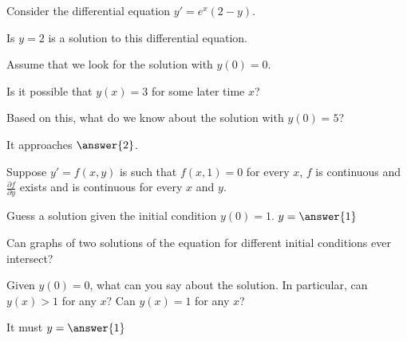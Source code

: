 \documentclass{ximera}
\begin{document}
\begin{exercise}
    Consider the differential equation $y' = e^x(2-y)$.
    
    Is $y = 2$ is a solution to this differential equation.
    \begin{multipleChoice}
    \end{multipleChoice}
    \begin{problem}
        Assume that we look for the solution with $y(0) = 0$. 
        \begin{multipleChoice}
        \end{multipleChoice}
        \begin{problem}
            Is it possible that $y(x) = 3$ for some later time $x$? 
            \begin{multipleChoice}
            \end{multipleChoice}
            \begin{problem}
                Based on this, what do we know about the solution with $y(0) = 5$?
                
                It approaches $\answer{2}$.
            \end{problem}
        \end{problem}
    \end{problem}
\end{exercise}

\begin{exercise}%
    Suppose $y' = f(x,y)$ is such that $f(x,1) = 0$ for every $x$, $f$ is continuous and $\frac{\partial f}{\partial y}$ exists and is continuous for every $x$ and $y$.
    
    Guess a solution given the initial condition $y(0) = 1$. $y = \answer{1}$
    \begin{problem}
        Can graphs of two solutions of the equation for different initial conditions ever intersect?
        \begin{multipleChoice}
        \end{multipleChoice}
        \begin{problem}
            Given $y(0) = 0$, what can you say about the solution.  In particular, can $y(x) > 1$ for any $x$?  Can $y(x) = 1$ for any $x$?
            
            It must  $y = \answer{1}$
        \end{problem}
    \end{problem}
\end{exercise}
\end{document}
